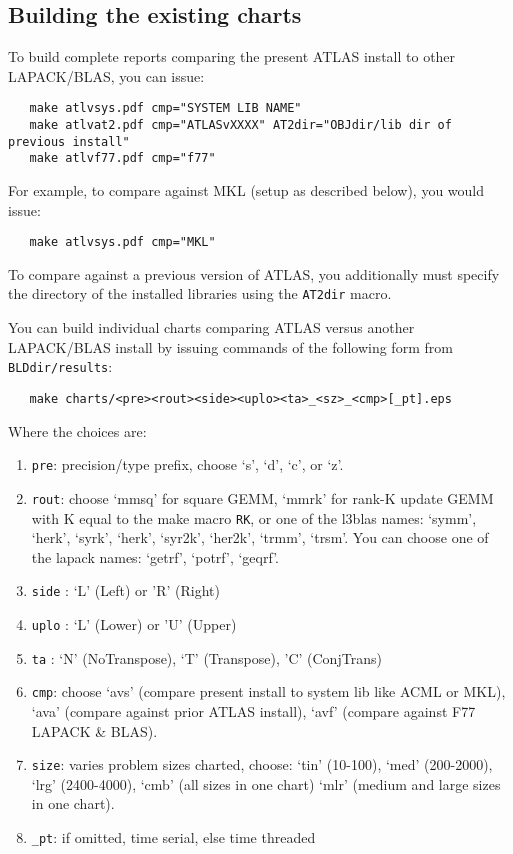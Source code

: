 \documentclass[11pt]{article}
\begin{document}
\subsection{Building the existing charts}
\label{sec-excharts}

To build complete reports comparing the present ATLAS install to other
LAPACK/BLAS, you can issue:
\begin{verbatim}
   make atlvsys.pdf cmp="SYSTEM LIB NAME"
   make atlvat2.pdf cmp="ATLASvXXXX" AT2dir="OBJdir/lib dir of previous install"
   make atlvf77.pdf cmp="f77"
\end{verbatim}

For example, to compare against MKL (setup as described below), you would issue:
\begin{verbatim}
   make atlvsys.pdf cmp="MKL"
\end{verbatim}

To compare against a previous version of ATLAS, you additionally must specify
the directory of the installed libraries using the \texttt{AT2dir} macro.

You can build individual charts comparing ATLAS versus another LAPACK/BLAS
install by issuing commands of the following form from {\tt BLDdir/results}:
\begin{verbatim}
   make charts/<pre><rout><side><uplo><ta>_<sz>_<cmp>[_pt].eps
\end{verbatim}
Where the choices are:
\begin{enumerate}
\item \verb+pre+: precision/type prefix, choose `s', `d', `c', or `z'.
\item \verb+rout+: choose `mmsq' for square GEMM, `mmrk' for rank-K
      update GEMM with K equal to the make macro \texttt{RK}, or
      one of the l3blas names: `symm', `herk', `syrk', `herk', `syr2k',
      `her2k', `trmm', `trsm'.  You can choose one of the lapack names:
      `getrf', `potrf', `geqrf'.
\item \verb+side+ : `L' (Left) or 'R' (Right)
\item \verb+uplo+ : `L' (Lower) or 'U' (Upper)
\item \verb+ta+ : `N' (NoTranspose), `T' (Transpose), 'C' (ConjTrans)
\item \verb+cmp+: choose `avs' (compare present install to system lib like
      ACML or MKL), `ava' (compare against prior ATLAS install),
      `avf' (compare against F77 LAPACK \& BLAS).
\item \verb+size+: varies problem sizes charted, choose: `tin' (10-100), 
      `med' (200-2000), `lrg' (2400-4000), `cmb' (all sizes in one chart)
       `mlr' (medium and large sizes in one chart).
\item \verb+_pt+: if omitted, time serial, else time threaded
\end{enumerate}
\end{document}
